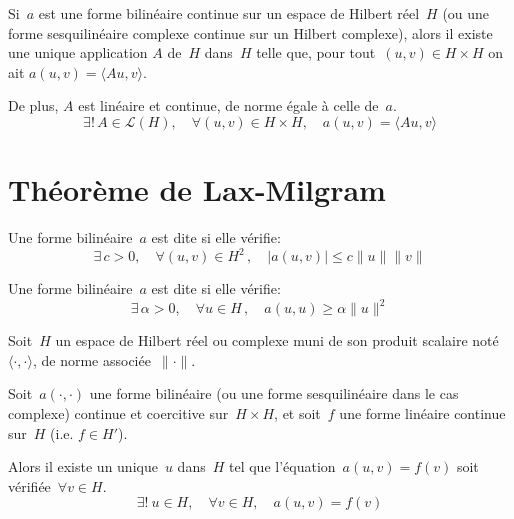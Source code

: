 %
Si~$a$ est une forme bilinéaire continue sur un espace de Hilbert réel~$H$ (ou une forme sesquilinéaire complexe continue sur un Hilbert complexe), alors il existe une unique application $A$ de~$H$ dans~$H$ telle que, pour tout~$(u,v)\in H\times H$ on ait $a(u,v)=\langle Au,v \rangle$.

De plus, $A$ est linéaire et continue, de norme égale à celle de~$a$.
\begin{equation}
\exists !\,A\in \mathcal{L}(H),\quad \forall (u,v)\in H\times H,\quad a(u,v)=\langle Au,v \rangle
\end{equation}

\medskip
\section{Théorème de Lax-Milgram}\label{Sec-ThLaxMilgram}\label{Sec:LaxMil}

\medskip
\begin{definition}
Une forme bilinéaire~$a$ est dite  si elle vérifie:
\begin{equation}
\exists\,c>0,\quad \forall (u,v)\in H^2\,,\quad |a(u,v)|\leq c\|u\|\|v\|
\end{equation}
\end{definition}

\medskip
\begin{definition}
Une forme bilinéaire~$a$ est dite  si elle vérifie:
\begin{equation}
\exists\,\alpha>0,\quad \forall u\in H\,,\quad a(u,u) \geq \alpha\|u\|^2
\end{equation}
\end{definition}

\medskip
\begin{theoreme}
Soit~$H$ un espace de Hilbert réel ou complexe muni de son produit scalaire noté $\langle\cdot,\cdot\rangle$, de norme associée~$\|\cdot\|$.

Soit~$a(\cdot,\cdot)$ une forme bilinéaire (ou une forme sesquilinéaire dans le cas complexe) continue et coercitive sur~$H\times H$, et soit~$f$ une forme linéaire continue sur~$H$ (i.e. $f\in H'$).

Alors il existe un unique~$u$ dans~$H$ tel que l'équation~$a(u,v) = f(v)$ soit vérifiée~$\forall v \in H$.
\begin{equation}
  \exists!\ u \in H,\quad \forall v\in H,\quad a(u,v)=f(v)
\end{equation}
\end{theoreme}

